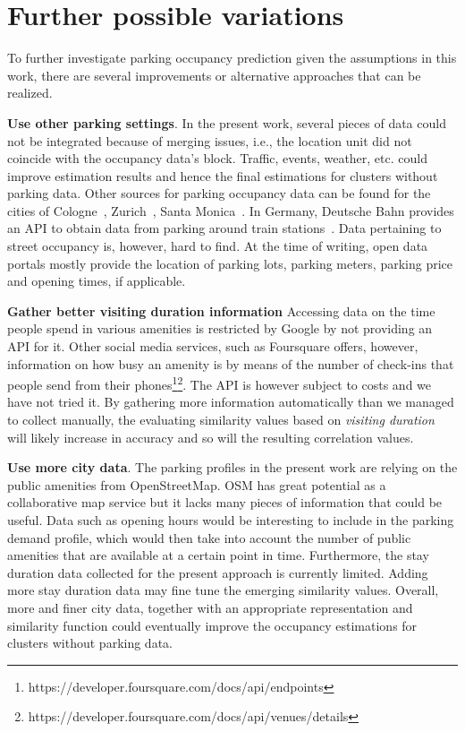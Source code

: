 	
\section{Further possible variations}
\label{conclusion:future_work}
To further investigate parking occupancy prediction given the assumptions in this work, there are several improvements or alternative approaches that can be realized.

\begin{romanlist}
	\item \textbf{Use other parking settings}.
	In the present work, several pieces of data could not be integrated because of merging issues, i.e., the location unit did not coincide with the occupancy data's block.
	Traffic, events, weather, etc. could improve estimation results and hence the final estimations for clusters without parking data.
	Other sources for parking occupancy data can be found for the cities of Cologne~\cite{cologne_data}, Zurich~\cite{zurich_data}, Santa Monica~\cite{santa_monica_data}.
	In Germany, Deutsche Bahn provides an API to obtain data from parking around train stations~\cite{dbbahn_data}.
	Data pertaining to street occupancy is, however, hard to find.
	At the time of writing, open data portals mostly provide the location of parking lots, parking meters, parking price and opening times, if applicable.  
	
	\item \textbf{Gather better visiting duration information}
	Accessing data on the time people spend in various amenities is restricted by Google by not providing an API for it. Other social media services, such as Foursquare offers, however, information on how busy an amenity is by means of the number of check-ins that people send from their phones\footnote{https://developer.foursquare.com/docs/api/endpoints}\footnote{https://developer.foursquare.com/docs/api/venues/details}. The API is however subject to costs and we have not tried it. By gathering more information automatically than we managed to collect manually, the evaluating similarity values based on \textit{visiting duration} will likely increase in accuracy and so will the resulting correlation values.  
	
	\item \textbf{Use more city data}.
	The parking profiles in the present work are relying on the public amenities from OpenStreetMap.
	OSM has great potential as a collaborative map service but it lacks many pieces of information that could be useful.
	Data such as opening hours would be interesting to include in the parking demand profile, which would then take into account the number of public amenities that are available at a certain point in time.
	Furthermore, the stay duration data collected for the present approach is currently limited.
	Adding more stay duration data may fine tune the emerging similarity values.
	Overall, more and finer city data, together with an appropriate representation and similarity function could eventually improve the occupancy estimations for clusters without parking data. 
	

\end{romanlist}
